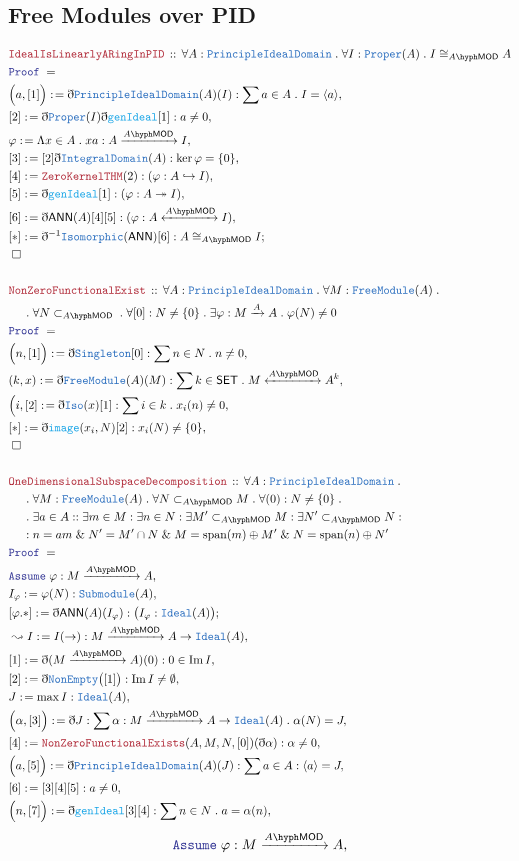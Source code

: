 \documentclass[12pt]{scrartcl}
\newcommand{\TYPE}[1]{\textcolor{NavyBlue}{\mathtt{#1}}}
\newcommand{\FUNC}[1]{\textcolor{Cerulean}{\mathtt{#1}}}
\newcommand{\LOGIC}[1]{\textcolor{Blue}{\mathtt{#1}}}
\newcommand{\THM}[1]{\textcolor{Maroon}{\mathtt{#1}}}
\renewcommand{\.}{\; . \;}
\newcommand{\de}{: \kern 0.1pc =}
\newcommand{\Theorem}[2]{& \THM{#1} \, :: \, #2 \\ & \Proof = \\ }
\newcommand{\NewLine}{\\ & \kern 1pc}
\newcommand{\Page}[1]{ \begin{align*} #1 \end{align*}   }
\newcommand{ \bd }{ \ByDef }
\renewcommand{\And}{\; \& \;}
\DeclareMathOperator*{\im}{Im}
\newcommand{\ToInj}{\hookrightarrow}
\newcommand{\ToSurj}{\twoheadrightarrow}
\newcommand{\Say}[3]{& #1 \de #2 : #3, \\}
\newcommand{\Conclude}[3]{& #1 \de #2 : #3; \\}
\newcommand{\Derive}[3]{& \leadsto #1 \de #2 : #3, \\}
\newcommand{\Assume}[2]{& \LOGIC{Assume} \; #1 : #2, \\}
\newcommand{\QED}{\; \square}
\newcommand{\EndProof}{& \QED \\}
\newcommand{\ByDef}{\eth}
\newcommand{\Proof}{\LOGIC{Proof} \; }
\newcommand{\Arrow}[1]{\xrightarrow{#1}}
\newcommand{\ToIso}[1]{\xleftrightarrow{#1}}
\newcommand{\SET}{\mathsf{SET}}
\newcommand{\submod}[1]{\subset_{\LMOD{#1}}}
\newcommand{\FM}{\TYPE{FreeModule}}
\DeclareMathOperator{\Span}{span}
\newcommand{\LMOD}[1]{#1\hyph\mathsf{MOD}}
\newcommand{\Ideal}{\TYPE{Ideal}}
\newcommand{\ID}{\TYPE{IntegralDomain}}
\newcommand{\PID}{\TYPE{PrincipleIdealDomain}}
\newcommand{\ANN}{\mathsf{ANN}}
\begin{document}
\subsection{Free Modules over PID }
\Page{
	\Theorem{IdealIsLinearlyARingInPID}{\forall A : \PID \. \forall I : \TYPE{Proper}(A) \. I \cong_{\LMOD{A}} A }
	\Say{\Big( a, [1]  \Big)}{\bd \PID(A)(I)}{\sum a \in A \. I = \langle a \rangle}
	\Say{[2]}{\bd \TYPE{Proper}(I)\bd \FUNC{genIdeal}[1]}{a \neq 0}
	\Say{\varphi}{\Lambda x \in A \. xa}{A \Arrow{\LMOD{A}} I}
	\Say{[3]}{[2]\bd \ID(A)}{\ker \varphi = \{0\}}
	\Say{[4]}{\THM{ZeroKernelTHM}(2)}{(\varphi : A \ToInj I)}
	\Say{[5]}{\bd \FUNC{genIdeal}[1]}{(\varphi : A \ToSurj I)}
	\Say{[6]}{\bd \ANN(A)[4][5]}{ (\varphi  : A \ToIso{\LMOD{A}} I)  }
	\Conclude{[*]}{\bd^{-1} \TYPE{Isomorphic}(\ANN)[6]}{A \cong_{\LMOD{A}} I}
	\EndProof
	\\
	\Theorem{NonZeroFunctionalExist}{\forall A : \PID \. \forall M : \FM(A) \. \NewLine \. \forall N \submod{A} \. 
		\forall [0] : N \neq \{0\} \. \exists \varphi : M \Arrow{A} A \. \varphi(N) \neq 0
	}
	\Say{\Big(n,[1]\Big)}{\bd \TYPE{Singleton}[0]}{\sum n \in N \. n \neq 0}
	\Say{(k,x)}{\bd \FM(A)(M)}{\sum k \in \SET \.  M \ToIso{\LMOD{A}} A^k }
	\Say{\Big(i,[2]}{\bd \TYPE{Iso}(x)[1]}{\sum i \in k \. x_i(n) \neq 0 }
	\Say{[*]}{\bd \FUNC{image}(x_i,N)[2]}{x_i(N) \neq \{0\}}
	\EndProof
	\\
	\Theorem{OneDimensionalSubspaceDecomposition}{
		\forall A : \PID \.  \NewLine \. \forall M : \FM(A) \.  \forall N  \submod{A} M  \. 
		\forall (0) : N \neq \{0\}  \. \NewLine \. \exists a \in A :  : \exists m \in M :  \exists n \in N : 
		\exists M' \submod{A} M : \exists N' \submod{A} N : \NewLine :
		n = am \And N' = M' \cap N \And M = \Span(m) \oplus M' \And N = \Span(n) \oplus N'
		}
	\Assume{\varphi}{M \Arrow{\LMOD{A}} A }
	\Say{I_\varphi}{\varphi(N)}{\TYPE{Submodule}(A)}
	\Conclude{[\varphi.*]}{\bd \ANN(A)(I_\varphi)}{ \big(I_\varphi : \Ideal(A)\big)  }
	\Derive{I}{I(\to)}{M \Arrow{\LMOD{A}} A \to \Ideal(A)}
	\Say{[1]}{\bd (M \Arrow{\LMOD{A}} A)(0)}{0 \in \im I}
	\Say{[2]}{\bd \TYPE{NonEmpty}\big([1]\big)}{\im I \neq \emptyset}
	\Say{J}{\max I}{\Ideal(A)}
	\Say{\Big(\alpha,[3]\Big)}{\bd J}{\sum \alpha : M \Arrow{\LMOD{A}} A \to \Ideal(A) \. \alpha(N) = J}
	\Say{[4]}{\THM{NonZeroFunctionalExists}(A,M,N,[0])(\bd \alpha)}{\alpha \neq 0}
	\Say{\Big(a,[5]\Big)}{\bd \PID(A)(J) }{ \sum a \in A : \langle a \rangle = J }
	\Say{[6]}{[3][4][5]}{a \neq 0}
	\Say{\Big( n, [7] \Big)}{\bd \FUNC{genIdeal}[3][4]}{ \sum n \in N \. a = \alpha(n)}  
}\Page{
	\Assume{\varphi}{M \Arrow{\LMOD{A}} A}
}
\end{document}
